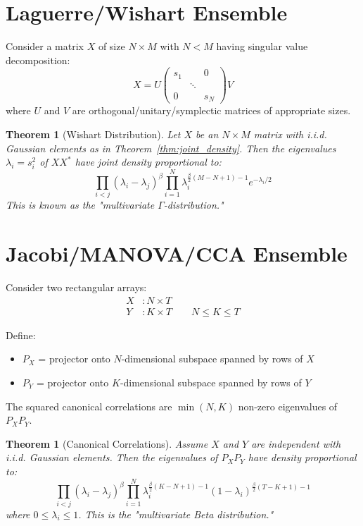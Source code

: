 \documentclass[letterpaper,11pt,oneside,reqno]{article}
\numberwithin{equation}{section}
\newtheorem{theorem}[proposition]{Theorem}
\theoremstyle{definition}
\begin{document}
\section{Laguerre/Wishart Ensemble}

Consider a matrix $X$ of size $N \times M$ with $N < M$ having singular value decomposition:
\[ X = U\begin{pmatrix}s_1 & & 0 \\ & \ddots & \\ 0 & & s_N\end{pmatrix}V \]
where $U$ and $V$ are orthogonal/unitary/symplectic matrices of appropriate sizes.

\begin{theorem}[Wishart Distribution]
Let $X$ be an $N\times M$ matrix with i.i.d. Gaussian elements as in Theorem~\ref{thm:joint_density}. Then the eigenvalues $\lambda_i = s_i^2$ of $XX^*$ have joint density proportional to:
\[ \prod_{i<j} (\lambda_i-\lambda_j)^\beta \prod_{i=1}^N \lambda_i^{\frac{\beta}{2}(M-N+1)-1} e^{-\lambda_i/2} \]
This is known as the "multivariate $\Gamma$-distribution."
\end{theorem}

\section{Jacobi/MANOVA/CCA Ensemble}

Consider two rectangular arrays:
\begin{align*}
X &: N\times T \\
Y &: K\times T \qquad N\leq K\leq T
\end{align*}

Define:
\begin{itemize}
\item $P_X$ = projector onto $N$-dimensional subspace spanned by rows of $X$
\item $P_Y$ = projector onto $K$-dimensional subspace spanned by rows of $Y$
\end{itemize}

The squared canonical correlations are $\min(N,K)$ non-zero eigenvalues of $P_XP_Y$.

\begin{theorem}[Canonical Correlations]
Assume $X$ and $Y$ are independent with i.i.d. Gaussian elements. Then the eigenvalues of $P_XP_Y$ have density proportional to:
\[ \prod_{i<j} (\lambda_i-\lambda_j)^\beta \prod_{i=1}^N \lambda_i^{\frac{\beta}{2}(K-N+1)-1} (1-\lambda_i)^{\frac{\beta}{2}(T-K+1)-1} \]
where $0\leq \lambda_i\leq 1$. This is the "multivariate Beta distribution."
\end{theorem}
\end{document}
